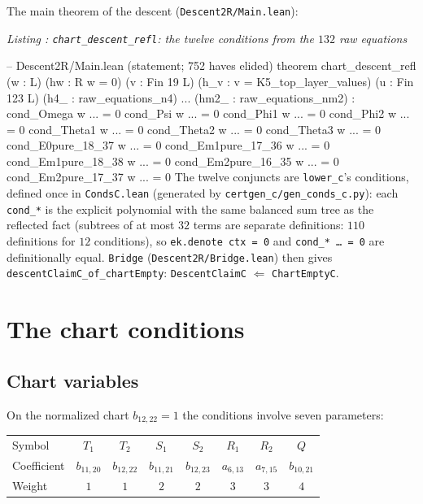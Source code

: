 \documentclass[a4paper,11pt]{article}
\newcounter{leanlisting}
\newenvironment{leanlisting}[2]{%
  \refstepcounter{leanlisting}\label{#2}%
  \begin{center}\textit{\small Listing \theleanlisting: #1}\end{center}%
  \Verbatim[breaklines=true,breakanywhere=true,fontsize=\footnotesize,frame=single,framesep=4pt,rulecolor=\color{gray!50},fillcolor=\color{gray!5}]%
}{%
  \endVerbatim%
}
\theoremstyle{plain}
\theoremstyle{definition}
\theoremstyle{remark}
\begin{document}
The main theorem of the descent (\texttt{Descent2R/Main.lean}):
\begin{leanlisting}{\texttt{chart\_descent\_refl}: the twelve conditions from the $132$ raw equations}{lst:descent}
-- Descent2R/Main.lean (statement; 752 haves elided)
theorem chart_descent_refl
  (w : L) (hw : R w = 0)
  (v : Fin 19 \to L) (h_v : v = K5_top_layer_values)
  (u : Fin 123 \to L)
  (h4_ : raw_equations_n4) ... (hm2_ : raw_equations_nm2) :
  cond_Omega w ... = 0 \land cond_Psi w ... = 0 \land
  cond_Phi1 w ... = 0 \land cond_Phi2 w ... = 0 \land
  cond_Theta1 w ... = 0 \land cond_Theta2 w ... = 0 \land cond_Theta3 w ... = 0 \land
  cond_E0pure_18_37 w ... = 0 \land cond_Em1pure_17_36 w ... = 0 \land
  cond_Em1pure_18_38 w ... = 0 \land cond_Em2pure_16_35 w ... = 0 \land
  cond_Em2pure_17_37 w ... = 0
\end{leanlisting}
The twelve conjuncts are \texttt{lower\_c}'s conditions, defined once in \texttt{CondsC.lean} (generated by \texttt{certgen\_c/}\linebreak\texttt{gen\_conds\_c.py}): each \texttt{cond\_*} is the explicit polynomial with the same balanced sum tree as the reflected fact (subtrees of at most $32$ terms are separate definitions: $110$ definitions for $12$ conditions), so \texttt{ek.denote ctx = 0} and \texttt{cond\_* \dots\ = 0} are definitionally equal. \texttt{Bridge} (\texttt{Descent2R/Bridge.lean}) then gives \texttt{descentClaimC\_of\_chartEmpty}: \texttt{DescentClaimC} $\Leftarrow$ \texttt{ChartEmptyC}.

\section{The chart conditions}\label{sec:conditions}

\subsection{Chart variables}

On the normalized chart $b_{12,22}=1$ the conditions involve seven parameters:

\begin{center}
\begin{tabular}{lccccccc}
\toprule
Symbol & $T_1$ & $T_2$ & $S_1$ & $S_2$ & $R_1$ & $R_2$ & $Q$ \\
Coefficient & $b_{11,20}$ & $b_{12,22}$ & $b_{11,21}$ & $b_{12,23}$ & $a_{6,13}$ & $a_{7,15}$ & $b_{10,21}$ \\
Weight & $1$ & $1$ & $2$ & $2$ & $3$ & $3$ & $4$ \\
\bottomrule
\end{tabular}
\end{center}
\end{document}
